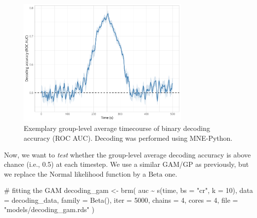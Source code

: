 \documentclass[
  doc,
  floatsintext,
  longtable,
  a4paper,
  nolmodern,
  notxfonts,
  notimes,
  colorlinks=true,linkcolor=blue,citecolor=blue,urlcolor=blue]{apa7}
\newenvironment{Shaded}{\begin{snugshade}}{\end{snugshade}}
\newcommand{\AttributeTok}[1]{\textcolor[rgb]{0.40,0.45,0.13}{#1}}
\newcommand{\CommentTok}[1]{\textcolor[rgb]{0.37,0.37,0.37}{#1}}
\newcommand{\DecValTok}[1]{\textcolor[rgb]{0.68,0.00,0.00}{#1}}
\newcommand{\FunctionTok}[1]{\textcolor[rgb]{0.28,0.35,0.67}{#1}}
\newcommand{\NormalTok}[1]{\textcolor[rgb]{0.00,0.23,0.31}{#1}}
\newcommand{\OtherTok}[1]{\textcolor[rgb]{0.00,0.23,0.31}{#1}}
\newcommand{\SpecialCharTok}[1]{\textcolor[rgb]{0.37,0.37,0.37}{#1}}
\newcommand{\StringTok}[1]{\textcolor[rgb]{0.13,0.47,0.30}{#1}}
\begin{document}
\begin{figure}[H]

\caption{Exemplary group-level average timecourse of binary decoding
accuracy (ROC AUC). Decoding was performed using MNE-Python.}

{\centering \includegraphics[width=0.75\textwidth,height=\textheight]{brms_meeg_files/figure-pdf/unnamed-chunk-2-1.pdf}

}

\end{figure}%

Now, we want to \emph{test} whether the group-level average decoding
accuracy is above chance (i.e., 0.5) at each timestep. We use a similar
GAM/GP as previously, but we replace the \(\mathrm{Normal}\) likelihood
function by a \(\mathrm{Beta}\) one.

\begin{Shaded}
\begin{Highlighting}[]
\CommentTok{\# fitting the GAM}
\NormalTok{decoding\_gam }\OtherTok{\textless{}{-}} \FunctionTok{brm}\NormalTok{(}
\NormalTok{    auc }\SpecialCharTok{\textasciitilde{}} \FunctionTok{s}\NormalTok{(time, }\AttributeTok{bs =} \StringTok{"cr"}\NormalTok{, }\AttributeTok{k =} \DecValTok{10}\NormalTok{),}
    \AttributeTok{data =}\NormalTok{ decoding\_data,}
    \AttributeTok{family =} \FunctionTok{Beta}\NormalTok{(),}
    \AttributeTok{iter =} \DecValTok{5000}\NormalTok{,}
    \AttributeTok{chains =} \DecValTok{4}\NormalTok{,}
    \AttributeTok{cores =} \DecValTok{4}\NormalTok{,}
    \AttributeTok{file =} \StringTok{"models/decoding\_gam.rds"}
\NormalTok{    )}
\end{Highlighting}
\end{Shaded}
\end{document}
